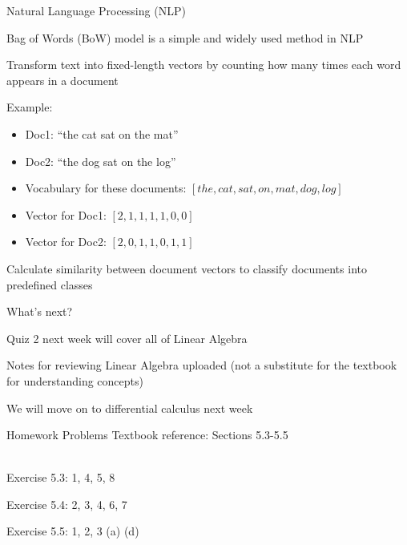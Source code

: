 \documentclass{./../../Latex/teaching_slides}
\begin{document}
\begin{frame}{Natural Language Processing (NLP)}
\vspace{-0.75em}
\begin{witemize}
  \item Bag of Words (BoW) model is a simple and widely used method in NLP
  \item Transform text into fixed-length vectors by counting how many times each word appears in a document
  \item Example: 
  \begin{itemize}
  \item Doc1: ``the cat sat on the mat''
  \item Doc2: ``the dog sat on the log''
  \item Vocabulary for these documents: $[the, cat, sat, on, mat, dog, log]$
  \item Vector for Doc1: $[2, 1, 1, 1, 1, 0, 0]$
  \item Vector for Doc2: $[2, 0, 1, 1, 0, 1, 1]$
\end{itemize}
\item Calculate similarity between document vectors to classify documents into predefined classes
\end{witemize}
\end{frame}

 \begin{frame}{What's next?}
 \begin{witemize}
  \item Quiz 2 next week will cover all of Linear Algebra
  \item Notes for reviewing Linear Algebra uploaded (not a substitute for the textbook for understanding concepts)
  \item We will move on to differential calculus next week
\end{witemize}
 \end{frame}
 
 \begin{frame}{Homework Problems}
 Textbook reference: Sections 5.3-5.5 \\~\
 \begin{witemize}
\item Exercise 5.3: 1, 4, 5, 8
\item Exercise 5.4: 2, 3, 4, 6, 7
  \item Exercise 5.5: 1, 2, 3 (a) (d)
\end{witemize}

\end{frame}
\end{document}
